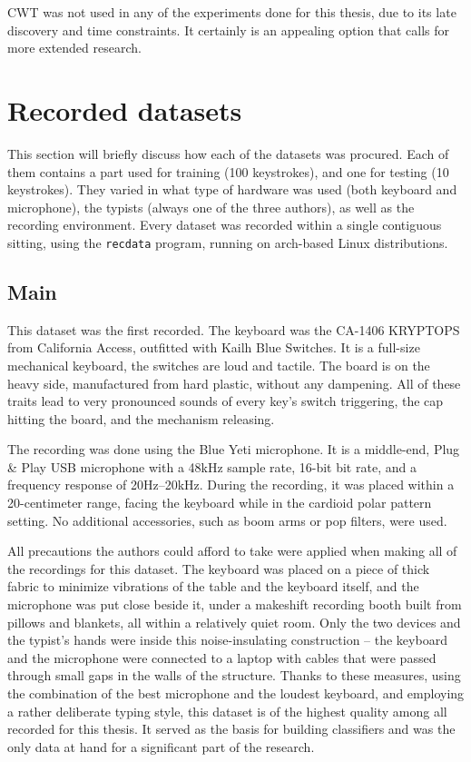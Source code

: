 \documentclass[../main.tex]{subfiles}
\begin{document}
CWT was not used in any of the experiments done for this thesis, due to its late discovery and time constraints.
It certainly is an appealing option that calls for more extended research.

\section{Recorded datasets}
\label{sec:dataset_recorded_datasets}
This section will briefly discuss how each of the datasets was procured. Each of them contains a part used for training
(100 keystrokes), and one for testing (10 keystrokes). They varied in what type of hardware was used (both keyboard
and microphone), the typists (always one of the three authors), as well as the recording environment.
Every dataset was recorded within a single contiguous sitting, using the \verb|recdata| program, running on
arch-based Linux distributions.

\subsection{Main}
\label{sec:dataset_main}

This dataset was the first recorded. The keyboard was the CA-1406 KRYPTOPS from California Access,
outfitted with Kailh Blue Switches.
It is a full-size mechanical keyboard, the switches are loud and tactile. The board is on the heavy side, manufactured
from hard plastic, without any dampening.
All of these traits lead to very pronounced sounds of every key's switch triggering, the cap hitting the board, and 
the mechanism releasing.

The recording was done using the Blue Yeti microphone. It is a middle-end, Plug \& Play USB microphone with
a 48kHz sample rate, 16-bit bit rate, and a frequency response of 20Hz--20kHz. During the recording,
it was placed within a 20-centimeter range, facing the keyboard while in the cardioid polar pattern setting.
No additional accessories, such as boom arms or pop filters, were used.


All precautions the authors could afford to take were applied when making all of the recordings for this dataset.
The keyboard was placed on a piece of thick fabric to minimize vibrations of the table and the keyboard itself,
and the microphone was put close beside it, under a makeshift recording booth built from pillows and blankets,
all within a relatively quiet room.
Only the two devices and the typist's hands were inside this noise-insulating construction -- the keyboard and the
microphone were connected to a laptop with cables that were passed through small gaps in the walls of the structure.
Thanks to these measures, using the combination of the best microphone and the loudest keyboard, and employing a
rather deliberate typing style, this dataset is of the highest quality among all recorded for this thesis.
It served as the basis for building classifiers and was the only data at hand for a significant part of the research. 
\end{document}
